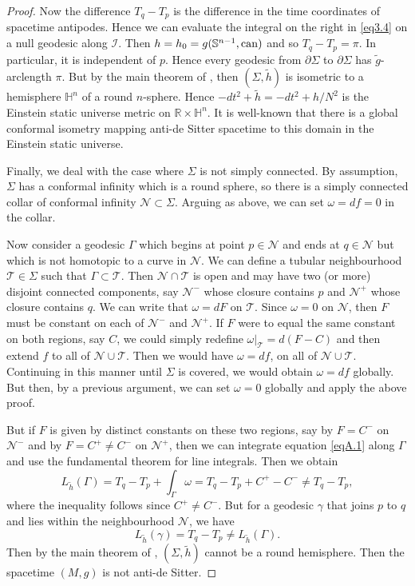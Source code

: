 \documentclass[12pt]{amsart}
\numberwithin{equation}{section}
\begin{document}
\begin{proof}
Now the difference $T_q-T_p$ is the difference in the time coordinates of spacetime antipodes. Hence we can evaluate the integral on the right in \eqref{eq3.4} on a null geodesic along ${\mathcal I}$. Then $h=h_0=g({\mathbb S}^{n-1},{\rm can})$ and so $T_q-T_p=\pi$. In particular, it is independent of $p$. Hence every geodesic from $\partial \Sigma$ to $\partial \Sigma$ has ${\tilde g}$-arclength $\pi$. But by the main theorem of \cite{Bangert}, then $(\Sigma,{\tilde h})$ is isometric to a hemisphere ${\mathbb H}^n$ of a round $n$-sphere. Hence $-dt^2+{\tilde h}=-dt^2+h/N^2$ is the Einstein static universe metric on ${\mathbb R}\times {\mathbb H}^n$. It is well-known that there is a global conformal isometry mapping anti-de Sitter spacetime to this domain in the Einstein static universe.

Finally, we deal with the case where $\Sigma$ is not simply connected. By assumption, $\Sigma$ has a conformal infinity which is a round sphere, so there is a simply connected collar of conformal infinity ${\mathcal N}\subset \Sigma$. Arguing as above, we can set $\omega=df=0$ in the collar.

Now consider a geodesic $\Gamma$ which begins at point $p\in{\mathcal N}$ and ends at $q\in{\mathcal N}$ but which is not homotopic to a curve in ${\mathcal N}$. We can define a tubular neighbourhood ${\mathcal T}\in\Sigma$ such that $\Gamma\subset{\mathcal T}$. Then ${\mathcal N}\cap{\mathcal T}$ is open and may have two (or more) disjoint connected components, say ${\mathcal N}^-$ whose closure contains $p$ and ${\mathcal N}^+$ whose closure contains $q$. We can write that $\omega=dF$ on ${\mathcal T}$. Since $\omega=0$ on ${\mathcal N}$, then $F$ must be constant on each of ${\mathcal N}^-$ and ${\mathcal N}^+$. If $F$ were to equal the same constant on both regions, say $C$, we could simply redefine $\omega\vert_{\mathcal T}=d(F-C)$ and then extend $f$ to all of ${\mathcal N}\cup{\mathcal T}$. Then we would have $\omega=df$, on all of ${\mathcal N}\cup{\mathcal T}$. Continuing in this manner until $\Sigma$ is covered, we would obtain $\omega=df$ globally. But then, by a previous argument, we can set $\omega=0$ globally and apply the above proof.

But if $F$ is given by distinct constants on these two regions, say by $F=C^-$ on ${\mathcal N}^-$ and by $F=C^+\neq C^-$ on ${\mathcal N}^+$, then we can integrate equation \eqref{eqA.1} along $\Gamma$ and use the fundamental theorem for line integrals. Then we obtain
\begin{equation}
\label{eq3.5}
L_{\tilde h}(\Gamma) = T_q-T_p + \int_{\Gamma}\omega = T_q-T_p +C^+-C^-\neq T_q-T_p,
\end{equation}
where the inequality follows since $C^+\neq C^-$. But for a geodesic $\gamma$ that joins $p$ to $q$ and lies within the neighbourhood ${\mathcal N}$, we have
\begin{equation}
\label{eq3.6}
L_{\tilde h}(\gamma) = T_q-T_p \neq L_{\tilde h}(\Gamma).
\end{equation}
Then by the main theorem of \cite{Bangert}, $(\Sigma,{\tilde h})$ cannot be a round hemisphere. Then the spacetime $(M,g)$ is not anti-de Sitter.
\end{proof}
\end{document}
